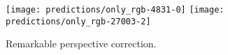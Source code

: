 \begin{figure}[H]
  \centering
  \texttt{[image: predictions/only\_rgb-4831-0]}  %
  \texttt{[image: predictions/only\_rgb-27003-2]}  %
  \caption{%
    Remarkable perspective correction. \\
  }%
  \label{fig:perspective-correction}
\end{figure}
